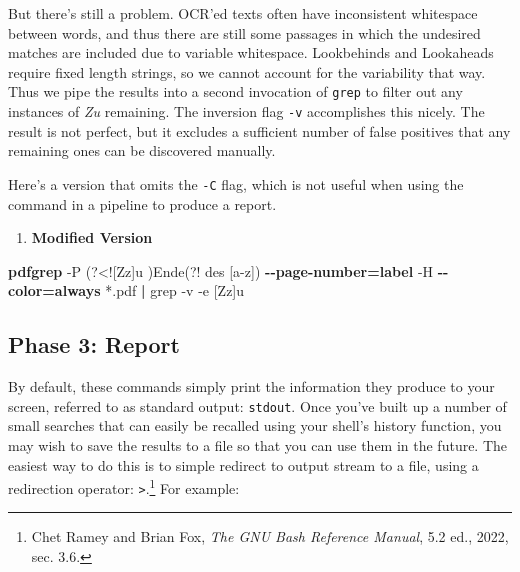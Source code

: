\documentclass[
  letterpaper,
]{tufte-handout}
\newenvironment{Shaded}{\begin{snugshade}}{\end{snugshade}}
\newcommand{\AttributeTok}[1]{\textcolor[rgb]{0.00,0.34,0.68}{#1}}
\newcommand{\ExtensionTok}[1]{\textcolor[rgb]{0.00,0.58,1.00}{\textbf{#1}}}
\newcommand{\FunctionTok}[1]{\textcolor[rgb]{0.39,0.29,0.61}{#1}}
\newcommand{\KeywordTok}[1]{\textcolor[rgb]{0.12,0.11,0.11}{\textbf{#1}}}
\newcommand{\NormalTok}[1]{\textcolor[rgb]{0.12,0.11,0.11}{#1}}
\newcommand{\PreprocessorTok}[1]{\textcolor[rgb]{0.00,0.43,0.16}{#1}}
\newcommand{\StringTok}[1]{\textcolor[rgb]{0.75,0.01,0.01}{#1}}
\providecommand{\tightlist}{%
  \setlength{\itemsep}{0pt}\setlength{\parskip}{0pt}}
\begin{document}
But there's still a problem. OCR'ed texts often have inconsistent
whitespace between words, and thus there are still some passages in
which the undesired matches are included due to variable whitespace.
Lookbehinds and Lookaheads require fixed length strings, so we cannot
account for the variability that way. Thus we pipe the results into a
second invocation of \texttt{grep} to filter out any instances of
\emph{Zu} remaining. The inversion flag \texttt{-v} accomplishes this
nicely. The result is not perfect, but it excludes a sufficient number
of false positives that any remaining ones can be discovered manually.

Here's a version that omits the \texttt{-C} flag, which is not useful
when using the command in a pipeline to produce a report.

\begin{enumerate}
\def\labelenumi{(\arabic{enumi})}
\setcounter{enumi}{6}
\tightlist
\item
  \textbf{Modified Version}
\end{enumerate}

\begin{Shaded}
\begin{Highlighting}[]
\ExtensionTok{pdfgrep}  \AttributeTok{{-}P} \StringTok{\textquotesingle{}(?\textless{}![Zz]u )Ende(?! des [a{-}z])\textquotesingle{}} 
\ExtensionTok{{-}{-}page{-}number=label} \AttributeTok{{-}H}  
\ExtensionTok{{-}{-}color=always} \PreprocessorTok{*}\NormalTok{.pdf }\KeywordTok{|} \FunctionTok{grep} \AttributeTok{{-}v} \AttributeTok{{-}e} \StringTok{\textquotesingle{}[Zz]u\textquotesingle{}}
\end{Highlighting}
\end{Shaded}

\subsection{Phase 3: Report}\label{phase-3-report}

By default, these commands simply print the information they produce to
your screen, referred to as standard output: \texttt{stdout}. Once
you've built up a number of small searches that can easily be recalled
using your shell's history function, you may wish to save the results to
a file so that you can use them in the future. The easiest way to do
this is to simple redirect to output stream to a file, using a
redirection operator: \texttt{\textgreater{}}.\footnote{Chet Ramey and
  Brian Fox, \emph{The GNU Bash Reference Manual}, 5.2 ed., 2022, sec.
  3.6.} For example:
\end{document}
